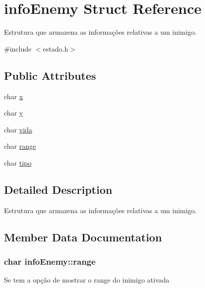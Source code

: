 \hypertarget{structinfoEnemy}{}\section{info\+Enemy Struct Reference}
\label{structinfoEnemy}


Estrutura que armazena as informações relativas a um inimigo.  




{\ttfamily \#include $<$estado.\+h$>$}

\subsection*{Public Attributes}
\begin{DoxyCompactItemize}
\item 
char \hyperlink{structinfoEnemy_a20155b918f06fb0d4fef4cc5ed8705df}{x}
\item 
char \hyperlink{structinfoEnemy_a89534bd4f2115fcbf522e82879dfb8eb}{y}
\item 
char \hyperlink{structinfoEnemy_a8905a46eaf64781c4a9138754ff170cc}{vida}
\item 
char \hyperlink{structinfoEnemy_a735609c82b88d27773532a3e541afb96}{range}
\item 
char \hyperlink{structinfoEnemy_a0a778048d7b2d14d11f0342e27d89528}{tipo}
\end{DoxyCompactItemize}


\subsection{Detailed Description}
Estrutura que armazena as informações relativas a um inimigo. 

\subsection{Member Data Documentation}
\subsubsection[{\texorpdfstring{range}{range}}]{\setlength{\rightskip}{0pt plus 5cm}char info\+Enemy\+::range}\hypertarget{structinfoEnemy_a735609c82b88d27773532a3e541afb96}{}\label{structinfoEnemy_a735609c82b88d27773532a3e541afb96}
Se tem a opção de mostrar o range do inimigo ativada 
